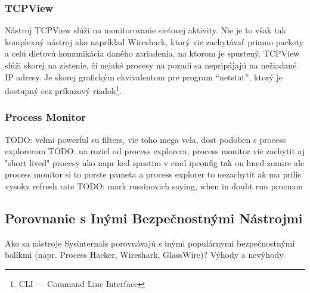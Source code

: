 \documentclass[conference]{IEEEtran}
\begin{document}
\subsubsection{TCPView}
Nástroj TCPView slúži na monitorovanie sieťovej aktivity. Nie je to však tak komplexný nástroj ako napríklad Wireshark, ktorý vie zachytávať priamo packety a celú dieťovú komunikácia daného zariadenia, na ktorom je spustený. TCPView slúži skorej na zistenie, či nejaké procesy na pozadí sa nepripájajú na nežiadané IP adresy. Je skorej grafickým ekvivalentom pre program ``netstat'', ktorý je dostupný cez príkazový riadok\footnote{CLI --- Command Line Interface}.



\subsubsection{Process Monitor}

TODO: velmi powerful su filters, vie toho mega vela, dost podoben s process explorerom
TODO: na roziel od process explorera, process monitor vie zachytit aj "short lived" procesy ako napr ked spustim v cmd ipconfig tak on hned zomire ale process monitor si to porste pameta a process explorer to nezachytit ak ma prilis vysoky refresh rate
TODO: mark russinovich saying, when in doubt run procmon








\subsection{Porovnanie s Inými Bezpečnostnými Nástrojmi}
Ako sa nástroje Sysinternals porovnávajú s inými populárnymi bezpečnostnými balíkmi (napr. Process Hacker, Wireshark, GlassWire)? Výhody a nevýhody.
\end{document}
